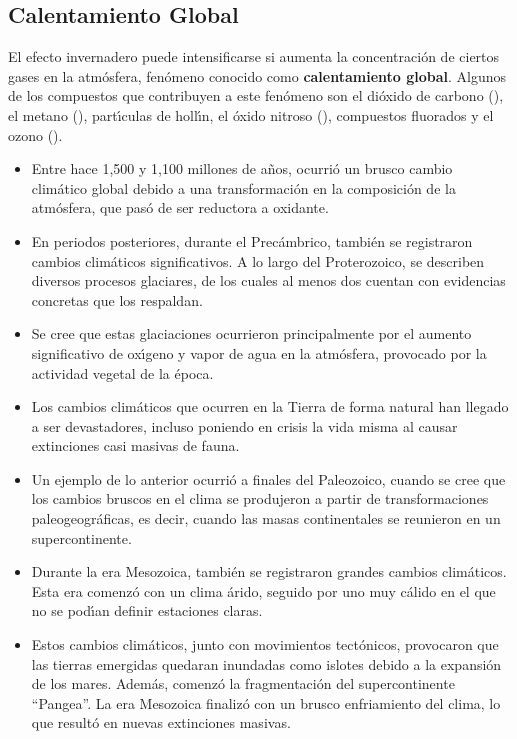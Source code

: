 \subsection{Calentamiento Global}\label{cglobal}
El efecto invernadero puede intensificarse si aumenta la concentraci\'on de ciertos gases en la atm\'osfera, fen\'omeno conocido como \textbf{calentamiento global}. Algunos de los compuestos que contribuyen a este fen\'omeno son el di\'oxido de carbono (), el metano (), part\'{\i}culas de holl\'{\i}n, el \'oxido nitroso (), compuestos fluorados y el ozono ().
\begin{itemize}
\item Entre hace 1,500 y 1,100 millones de a\~nos, ocurri\'o un brusco cambio clim\'atico global debido a una transformaci\'on en la composici\'on de la atm\'osfera, que pas\'o de ser reductora a oxidante.
\item En periodos posteriores, durante el Prec\'ambrico, tambi\'en se registraron cambios clim\'aticos significativos. A lo largo del Proterozoico, se describen diversos procesos glaciares, de los cuales al menos dos cuentan con evidencias concretas que los respaldan.
\item Se cree que estas glaciaciones ocurrieron principalmente por el aumento significativo de ox\'{\i}geno y vapor de agua en la atm\'osfera, provocado por la actividad vegetal de la \'epoca.
\item Los cambios clim\'aticos que ocurren en la Tierra de forma natural han llegado a ser devastadores, incluso poniendo en crisis la vida misma al causar extinciones casi masivas de fauna.
\item Un ejemplo de lo anterior ocurri\'o a finales del Paleozoico, cuando se cree que los cambios bruscos en el clima se produjeron a partir de transformaciones paleogeogr\'aficas, es decir, cuando las masas continentales se reunieron en un supercontinente.
\item Durante la era Mesozoica, tambi\'en se registraron grandes cambios clim\'aticos. Esta era comenz\'o con un clima \'arido, seguido por uno muy c\'alido en el que no se pod\'{\i}an definir estaciones claras.
\item Estos cambios clim\'aticos, junto con movimientos tect\'onicos, provocaron que las tierras emergidas quedaran inundadas como islotes debido a la expansi\'on de los mares. Adem\'as, comenz\'o la fragmentaci\'on del supercontinente ``Pangea''. La era Mesozoica finaliz\'o con un brusco enfriamiento del clima, lo que result\'o en nuevas extinciones masivas.
\end{itemize}

